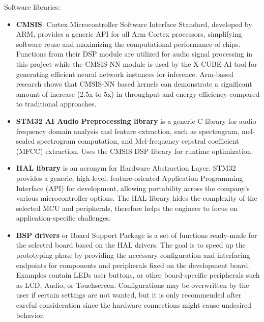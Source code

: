   
Software libraries:
\begin{itemize}
  \item \textbf{CMSIS}: Cortex Microcontroller Software Interface Standard, developed by ARM, provides a generic API for all Arm Cortex processors, simplifying software reuse and maximizing the computational performance of chips. Functions from their DSP module are utilized for audio signal processing in this project while the CMSIS-NN module is used by the X-CUBE-AI tool for generating efficient neural network instances for inference. Arm-based research \cite{lai2018cmsisnn} shows that CMSIS-NN based kernels can demonstrate a significant amount of increase (2.5x to 5x) in throughput and energy efficiency compared to traditional approaches.
  
  \item  \textbf{STM32 AI Audio Preprocessing library} is a generic C library for audio frequency domain analysis and feature extraction, such as spectrogram, mel-scaled spectrogram computation, and Mel-frequency cepstral coefficient (MFCC) extraction. Uses the CMSIS DSP library for runtime optimization.
  
  \item  \textbf{HAL library} is an acronym for Hardware Abstraction Layer. STM32 provides a generic, high-level, feature-oriented Application Programming Interface (API) for development, allowing portability across the company's various microcontroller options. The HAL library hides the complexity of the selected MCU and peripherals, therefore helps the engineer to focus on application-specific challenges.
  \item  \textbf{BSP drivers} or Board Support Package is a set of functions ready-made for the selected board based on the HAL drivers. The goal is to speed up the prototyping phase by providing the necessary configuration and interfacing endpoints for components and peripherals fixed on the development board. Examples contain LEDs user buttons, or other board-specific peripherals such as LCD, Audio, or Touchscreen. Configurations may be overwritten by the user if certain settings are not wanted, but it is only recommended after careful consideration since the hardware connections might cause undesired behavior.

\end{itemize}


